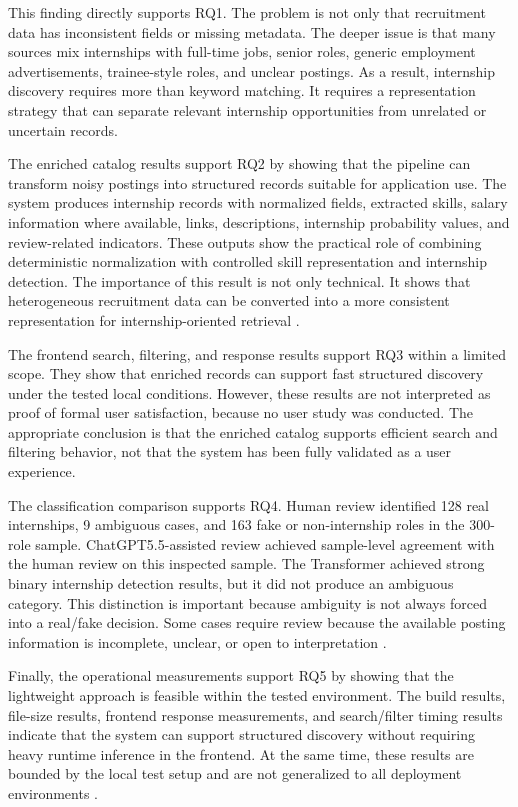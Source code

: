 This finding directly supports RQ1. The problem is not only that recruitment data has
inconsistent fields or missing metadata. The deeper issue is that many sources mix internships
with full-time jobs, senior roles, generic employment advertisements, trainee-style roles, and
unclear postings. As a result, internship discovery requires more than keyword matching. It
requires a representation strategy that can separate relevant internship opportunities from
unrelated or uncertain records.

The enriched catalog results support RQ2 by showing that the pipeline can transform noisy
postings into structured records suitable for application use. The system produces internship
records with normalized fields, extracted skills, salary information where available, links,
descriptions, internship probability values, and review-related indicators. These outputs show
the practical role of combining deterministic normalization with controlled skill
representation and internship detection. The importance of this result is not only technical. It
shows that heterogeneous recruitment data can be converted into a more consistent
representation for internship-oriented retrieval \cite{doan2012principles, batini2009methodologies, manning2008introduction}.

The frontend search, filtering, and response results support RQ3 within a limited scope. They
show that enriched records can support fast structured discovery under the tested local
conditions. However, these results are not interpreted as proof of formal user
satisfaction, because no user study was conducted. The appropriate conclusion is that the
enriched catalog supports efficient search and filtering behavior, not that the system has been
fully validated as a user experience.

The classification comparison supports RQ4. Human review identified 128 real internships, 9
ambiguous cases, and 163 fake or non-internship roles in the 300-role sample.
ChatGPT5.5-assisted review achieved sample-level agreement with the human review on this
inspected sample. The Transformer achieved strong binary internship detection results, but it
did not produce an ambiguous category. This distinction is important because ambiguity
is not always forced into a real/fake decision. Some cases require review because the
available posting information is incomplete, unclear, or open to interpretation \cite{sokolova2009systematic, krippendorff2004content}.

Finally, the operational measurements support RQ5 by showing that the lightweight approach
is feasible within the tested environment. The build results, file-size results, frontend
response measurements, and search/filter timing results indicate that the system can support
structured discovery without requiring heavy runtime inference in the frontend. At the same
time, these results are bounded by the local test setup and are not generalized to all
deployment environments \cite{jain1991art, schwartz2020green}.


